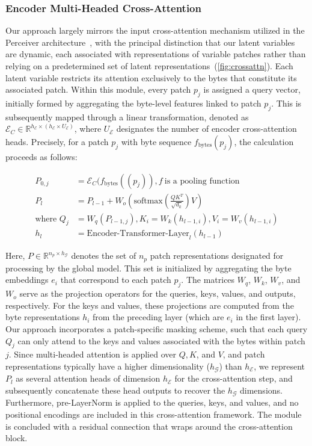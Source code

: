 \subsubsection{Encoder Multi-Headed Cross-Attention}
\label{sec:enc-cross-attn}
Our approach largely mirrors the input cross-attention mechanism utilized in the Perceiver architecture~\citep{jaegle2021perceiver}, with the principal distinction that our latent variables are dynamic, each associated with representations of variable patches rather than relying on a predetermined set of latent representations~(\autoref{fig:crossattn}). Each latent variable restricts its attention exclusively to the bytes that constitute its associated patch. Within this module, every patch $p_j$ is assigned a query vector, initially formed by aggregating the byte-level features linked to patch $p_j$. This is subsequently mapped through a linear transformation, denoted as $\mathcal{E}_{C} \in \mathbb{R}^{h_{\mathcal{E}} \times (h_{\mathcal{E}} \times U_{\mathcal{E}})}$, where $U_{\mathcal{E}}$ designates the number of encoder cross-attention heads. Precisely, for a patch $p_j$ with byte sequence $f_{\text{bytes}}(p_j)$, the calculation proceeds as follows:

\begin{align}
P_{0,j} &= \mathcal{E}_{C}(f_\text{bytes}((p_j)), f~ \text{is a pooling function} \\
P_l &= P_{l-1} + W_o\left(\text{softmax}\left(\frac{QK^T}{\sqrt{d_k}}\right)V\right) \\
\text{where } Q_j &= W_q(P_{l-1,j}), K_i = W_k(h_{l-1,i}), V_i = W_v(h_{l-1,i}) \\
h_l &= \text{Encoder-Transformer-Layer}_l(h_{l-1})
\end{align}

Here, $P \in \mathbb{R}^{n_p \times h_{\mathcal{G}}}$ denotes the set of $n_p$ patch representations designated for processing by the global model. This set is initialized by aggregating the byte embeddings $e_i$ that correspond to each patch $p_j$. The matrices $W_q$, $W_k$, $W_v$, and $W_o$ serve as the projection operators for the queries, keys, values, and outputs, respectively. For the keys and values, these projections are computed from the byte representations $h_i$ from the preceding layer (which are $e_i$ in the first layer). Our approach incorporates a patch-specific masking scheme, such that each query $Q_j$ can only attend to the keys and values associated with the bytes within patch $j$. Since multi-headed attention is applied over $Q, K$, and $V$, and patch representations typically have a higher dimensionality ($h_{\mathcal{G}}$) than $h_{\mathcal{E}}$, we represent $P_l$ as several attention heads of dimension $h_{\mathcal{E}}$ for the cross-attention step, and subsequently concatenate these head outputs to recover the $h_{\mathcal{G}}$ dimensions. Furthermore, pre-LayerNorm is applied to the queries, keys, and values, and no positional encodings are included in this cross-attention framework. The module is concluded with a residual connection that wraps around the cross-attention block.

